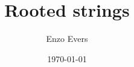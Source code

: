 \documentclass{book}
\title{Rooted strings}
\author{Enzo Evers}
\date{\today}
\begin{document}
%

\maketitle

\tableofcontents


\newpage

\newpage

\newpage

\newpage

\newpage

\newpage

\newpage


\printbibliography

\begin{appendices}

\newpage

\end{appendices}
\end{document}
